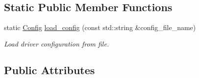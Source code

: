 \subsection*{Static Public Member Functions}
\begin{DoxyCompactItemize}
\item 
static \hyperlink{structblmc__robots_1_1NJointBlmcRobotDriver_1_1Config}{Config} \hyperlink{structblmc__robots_1_1NJointBlmcRobotDriver_1_1Config_a1499dfca020da9c45bfe5cbdcf9872f9}{load\+\_\+config} (const std\+::string \&config\+\_\+file\+\_\+name)
\begin{DoxyCompactList}\small\item\em Load driver configuration from file. \end{DoxyCompactList}\end{DoxyCompactItemize}
\subsection*{Public Attributes}
